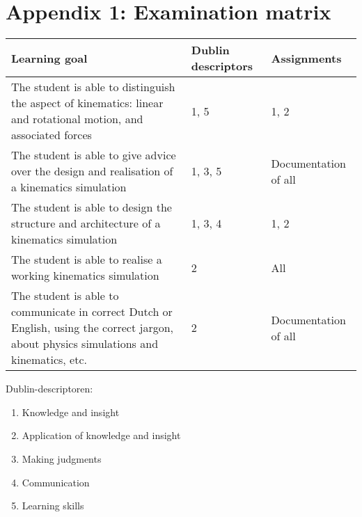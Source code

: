 \section*{Appendix 1: Examination matrix}
	\begin{tabular}{|p{7cm}|p{3.5cm}|p{5cm}|}
		\hline
		Learning goal & Dublin descriptors & Assignments \\
		\hline
		The student is able to distinguish the aspect of kinematics: linear and rotational motion, and associated forces
			& 1, 5
			& 1, 2 \\
		\hline
        The student is able to give advice over the design and realisation of a kinematics simulation
        	& 1, 3, 5 
        	& Documentation of all \\
		\hline
		The student is able to design the structure and architecture of a kinematics simulation 
			& 1, 3, 4
        	& 1, 2 \\
		\hline
		The student is able to realise a working kinematics simulation
			& 2 
			& All \\
		\hline
		The student is able to communicate in correct Dutch or English, using the correct jargon, about physics simulations and kinematics, etc.
			& 2 
			& Documentation of all  \\
		\hline
	\end{tabular}
	
	\vspace{1cm}

	Dublin-descriptoren:
	\begin{enumerate}
		\item Knowledge and insight
		\item Application of knowledge and insight
		\item Making judgments
		\item Communication
		\item Learning skills
	\end{enumerate}
	
